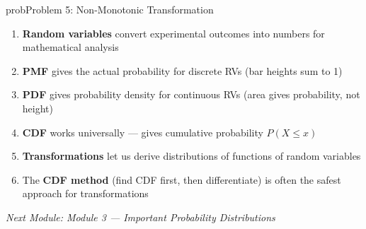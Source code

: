\begin{PSbox}[unbreakable]{prob}{Problem 5: Non-Monotonic Transformation}
\begin{Shaded}
\begin{Highlighting}[]
 \OperatorTok{=} \OperatorTok{;}
 \OperatorTok{=} \OperatorTok{*}\NormalTok{(}\OperatorTok{,}\NormalTok{) }\OperatorTok{{-}} \OperatorTok{;}   
 \OperatorTok{=} \OperatorTok{;}
\NormalTok{(}\OperatorTok{,} \OperatorTok{,} \OperatorTok{,} \NormalTok{)}\OperatorTok{;}
 \OperatorTok{;}
 \OperatorTok{=} \NormalTok{(}\OperatorTok{,} \OperatorTok{,} \NormalTok{)}\OperatorTok{;}
\NormalTok{(}\OperatorTok{,} \NormalTok{(}\OperatorTok{*}\NormalTok{(}\NormalTok{))}\OperatorTok{,} \OperatorTok{,} \OperatorTok{,} \NormalTok{)}\OperatorTok{;}
\NormalTok{(}\OperatorTok{,} \NormalTok{)}\OperatorTok{;}
\NormalTok{(}\NormalTok{)}\OperatorTok{;} \NormalTok{(}\NormalTok{)}\OperatorTok{;}
\end{Highlighting}
\end{Shaded}

\end{PSbox}


\begin{enumerate}
\def\labelenumi{\arabic{enumi}.}
\tightlist
\item
  \textbf{Random variables} convert experimental outcomes into numbers for mathematical analysis
\item
  \textbf{PMF} gives the actual probability for discrete RVs (bar heights sum to 1)
\item
  \textbf{PDF} gives probability density for continuous RVs (area gives probability, not height)
\item
  \textbf{CDF} works universally — gives cumulative probability $P(X \le x)$
\item
  \textbf{Transformations} let us derive distributions of functions of random variables
\item
  The \textbf{CDF method} (find CDF first, then differentiate) is often the safest approach for transformations
\end{enumerate}

\emph{Next Module: {Module 3 — Important Probability Distributions}}
